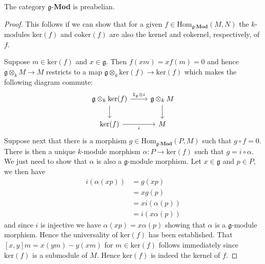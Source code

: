 \begin{lemma}
  The category $ \mathfrak{g} $-\textbf{Mod} is preabelian.
\end{lemma}
\begin{proof}
  This follows if we can show that for a given $ f \in \text{Hom}_{\mathfrak{g}\text{-}\mathbf{Mod}}(M ,N) $ the $ k $-modules $ \text{ker}(f) $ and $ \text{coker}(f) $ are also the kernel and cokernel, respectively, of $ f $.

  Suppose $ m \in \text{ker}(f) $ and $ x \in \mathfrak{g} $. Then $ f(xm) = xf(m) = 0 $ and hence $ \mathfrak{g} \otimes_k M \to M $ restricts to a map $ \mathfrak{g} \otimes_k \text{ker}(f) \to \text{ker}(f) $ which makes the following diagram commute:
  \[\begin{tikzcd}
	  {\mathfrak{g} \otimes_k \text{ker}(f)} & {\mathfrak{g} \otimes_k M} \\
	  {\text{ker}(f)} & M
	  \arrow[from=1-1, to=2-1]
	  \arrow["i"', from=2-1, to=2-2]
	  \arrow[from=1-2, to=2-2]
	  \arrow["{1_\mathfrak{g} \otimes i}", from=1-1, to=1-2]
  \end{tikzcd}\]
  Suppose next that there is a morphism $ g \in \text{Hom}_{\mathfrak{g}\text{-}\mathbf{Mod}}(P, M) $ such that $ g\circ f = 0 $. There is then a unique $ k $-module morphism $ \alpha:P \to \text{ker}(f) $ such that $ g = i\circ \alpha $. We just need to show that $ \alpha $ is also a $ \mathfrak{g} $-module morphism. Let $ x \in \mathfrak{g} $ and $ p \in P $, we then have
  \begin{align*}
    i(\alpha(xp)) &= g(xp) \\
                  &= xg(p) \\
                  &= x i(\alpha(p)) \\
                  &= i(x\alpha(p))
  \end{align*}
  and since $ i $ is injective we have $ \alpha(xp) = x\alpha(p) $ showing that $ \alpha $ is a $ \mathfrak{g} $-module morphism. Hence the universality of $ \text{ker}(f) $ has been established. That $ [x,y]m = x(ym) - y(xm) $ for $ m \in \text{ker}(f) $ follows immediately since $ \text{ker}(f) $ is a submodule of $ M $. Hence $ \text{ker}(f) $ is indeed the kernel of $ f $.


\end{proof}
